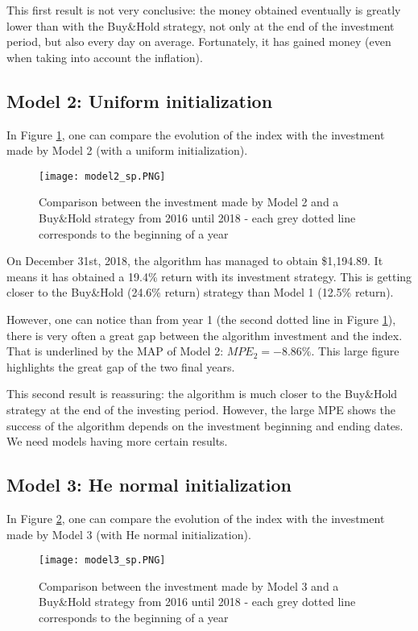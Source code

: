 \documentclass[11pt]{article}
\begin{document}
\begin{onehalfspace}
This first result is not very conclusive: the money obtained eventually is greatly lower than with the Buy\&Hold strategy, not only at the end of the investment period, but also every day on average. Fortunately, it has gained money (even when taking into account the inflation). 

\subsection{Model 2: Uniform initialization}

In Figure \ref{fig:plot_model2}, one can compare the evolution of the index with the investment made by Model 2 (with a uniform initialization).

\begin{figure}[h!]
    \centering
    \texttt{[image: model2\_sp.PNG]}
    \caption{Comparison between the investment made by Model 2 and a Buy\&Hold strategy from 2016 until 2018 - each grey dotted line corresponds to the beginning of a year}
\label{fig:plot_model2}
\end{figure}

On December 31st, 2018, the algorithm has managed to obtain \$1,194.89. It means it has obtained a 19.4\% return with its investment strategy. This is getting closer to the Buy\&Hold (24.6\% return) strategy than Model 1 (12.5\% return). 

However, one can notice than from year 1 (the second dotted line in Figure \ref{fig:plot_model2}), there is very often a great gap between the algorithm investment and the index. That is underlined by the MAP of Model 2: $MPE_2 = -8.86\%$. This large figure highlights the great gap of the two final years. 

This second result is reassuring: the algorithm is much closer to the Buy\&Hold strategy at the end of the investing period. However, the large MPE shows the success of the algorithm depends on the investment beginning and ending dates. We need models having more certain results.

\subsection{Model 3: He normal initialization}

In Figure \ref{fig:plot_model3}, one can compare the evolution of the index with the investment made by Model 3 (with He normal initialization).

\begin{figure}[h!]
    \centering
    \texttt{[image: model3\_sp.PNG]}
    \caption{Comparison between the investment made by Model 3 and a Buy\&Hold strategy from 2016 until 2018 - each grey dotted line corresponds to the beginning of a year}
\label{fig:plot_model3}
\end{figure}


\end{onehalfspace}
\end{document}
